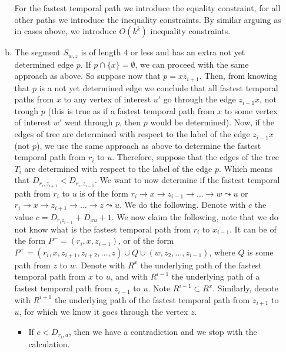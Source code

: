 \documentclass[a4paper,UKenglish,cleveref, autoref, thm-restate]{lipics-v2021}
\begin{document}
\begin{enumerate}[(i)]
\begin{enumerate}[(a)]
        For the fastest temporal path we introduce the equality constraint, 
        for all other paths we introduce the inequality constraints.
        By similar arguing as in cases above, we introduce $O(k^k)$ inequality constraints.
        \item The segment $S_{w,z}$ is of length $4$ or less
        and has an extra not yet determined edge $p$. 
        If $p \cap \{x\} = \emptyset$, 
        we can proceed with the same approach as above.
        So suppose now that $p = x z_{i+1}$.  
        Then, from knowing that $p$ is a not yet determined edge we conclude that
        all fastest temporal paths from $x$ to any vertex of interest $u'$ go through the edge $z_{i-1}x$, not trough $p$ 
        (this is true as if a fastest temporal path from $x$ to some vertex of interest $w'$ went through $p$, then $p$ would be determined).
        Now, if the edges of tree are determined with respect to the label of the edge $z_{i-1}x$ (not $p$),
        we use the same approach as above to determine the fastest temporal path from $r_i$ to $u$.
        Therefore, suppose that the edges of the tree $T_i$ are determined with respect to the label of the edge $p$.
        Which means that $D_{r_i, z_{i+1}} < D_{r_i, z_{i-1}}$.
        We want to now determine if the fastest temporal path from $r_i$ to $u$ is of the form 
        $r_i \rightarrow x \rightarrow z_{i-1} \rightarrow \dots \rightarrow w \leadsto u$ or
        $r_i \rightarrow x \rightarrow z_{i+1} \rightarrow \dots \rightarrow z \leadsto u$.
        We do the following.
        Denote with $c$ the value $c = D_{r_i z_{i-1}} + D_{x u} + 1$.
        We now claim the following, note that we do not know what is the fastest temporal path from $r_i$ to $x_{i-1}$. 
        It can be of the form $P^- = (r_i,x,z_{i-1})$,
        or of the form $P^+ = (r_i,x, z_{i+1}, z_{i+2}, \dots, z) \cup Q \cup (w, z_2, \dots, z_{i-1})$, where $Q$ is some path from $z$ to $w$.
        Denote with $R^x$ the underlying path of the fastest temporal path from $x$ to $u$,
        and with $R^{i-1}$ the underlying path of a fastest temporal path from $z_{i-1}$ to $u$.
        Note $R^{i-1} \subset R^x$.
        Similarly,
        denote with $R^{i+1}$ the underlying path of the fastest temporal path from $z_{i+1}$ to $u$, 
        for which we know it goes through the vertex $z$.
        \begin{itemize}
            \item  If $c < D_{r_i,u}$, then we have a contradiction and we stop with the calculation.\\

\end{itemize}
\end{enumerate}
\end{enumerate}
\end{document}
